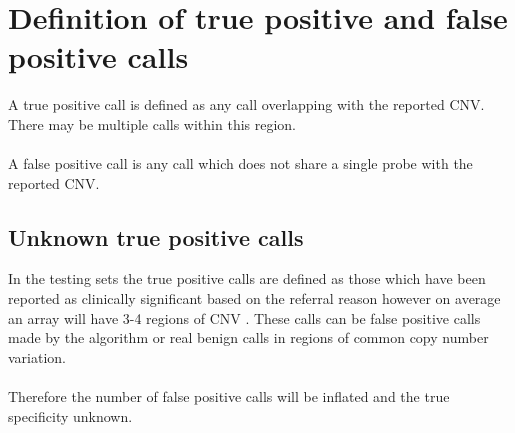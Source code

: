 \section{Definition of true positive and false positive calls}
A true positive call is defined as any call overlapping with the reported CNV. There may be multiple calls within this region.
\paragraph*{}
A false positive call is any call which does not share a single probe with the reported CNV.

\subsection{Unknown true positive calls}
In the testing sets the true positive calls are defined as those which have been reported as clinically significant based on the referral reason however on average an array will have 3-4 regions of CNV \cite{joowook_ahn_average_2015}. These calls can be false positive calls made by the algorithm or real benign calls in regions of common copy number variation.
\paragraph*{}
Therefore the number of false positive calls will be inflated and the true specificity unknown.